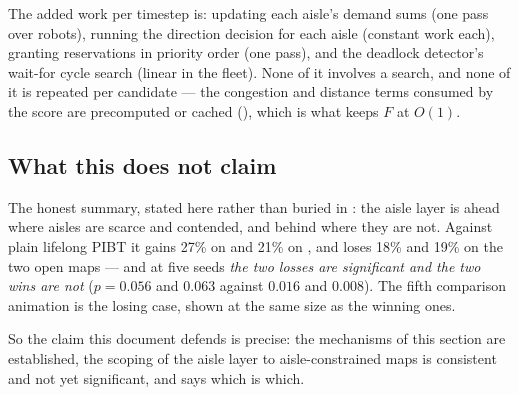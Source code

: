 The added work per timestep is: updating each aisle's demand sums
(one pass over robots), running the direction decision for each aisle (constant
work each), granting reservations in priority order (one pass), and the
deadlock detector's wait-for cycle search (linear in the fleet). None of it
involves a search, and none of it is repeated per candidate --- the congestion
and distance terms consumed by the score are precomputed or cached
(), which is what keeps $F$ at $O(1)$.

\subsection{What this does not claim}
\label{sec:contribution-scope}

The honest summary, stated here rather than buried in : the
aisle layer is ahead where aisles are scarce and contended, and behind where
they are not. Against plain lifelong PIBT it gains 27\% on
 and 21\% on , and
loses 18\% and 19\% on the two open maps --- and at five seeds \emph{the two
losses are significant and the two wins are not} ($p = 0.056$ and $0.063$
against $0.016$ and $0.008$). The fifth comparison animation is the losing
case, shown at the same size as the winning ones.

So the claim this document defends is precise: the mechanisms of this section
are established, the scoping of the aisle layer to aisle-constrained maps is
consistent and not yet significant, and  says which is which.
